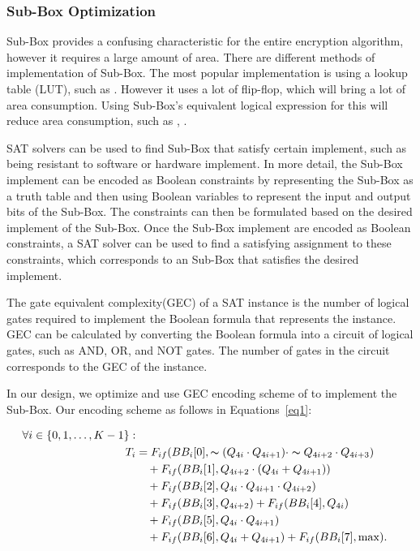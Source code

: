 \documentclass[sn-basic]{sn-jnl}%
\begin{document}
\subsubsection{Sub-Box Optimization }\label{subsubsec1}
Sub-Box provides a confusing characteristic for the entire encryption algorithm, however it requires a large amount of area.
There are different methods of implementation of Sub-Box.
The most popular implementation is using a lookup table (LUT), such as \cite{lara2017lightweight}.
However it uses a lot of flip-flop, which will bring a lot of area consumption.
Using Sub-Box's equivalent logical expression for this will reduce area consumption, such as \cite{bao2019peigen}, \cite{bib16}.

SAT solvers can be used to find Sub-Box that satisfy certain implement, such as being resistant to software or hardware implement.
In more detail, the Sub-Box implement can be encoded as Boolean constraints by representing the Sub-Box as a truth table and then using Boolean variables to represent the input and output bits of the Sub-Box.
The constraints can then be formulated based on the desired implement of the Sub-Box.
Once the Sub-Box implement are encoded as Boolean constraints, a SAT solver can be used to find a satisfying assignment to these constraints, which corresponds to an Sub-Box that satisfies the desired implement.

The gate equivalent complexity(GEC) of a SAT instance is the number of logical gates required to implement the Boolean formula that represents the instance.
GEC can be calculated by converting the Boolean formula into a circuit of logical gates, such as AND, OR, and NOT gates.
The number of gates in the circuit corresponds to the GEC of the instance.

In our design, we optimize and use GEC encoding scheme of \cite{bib16} to implement the Sub-Box.
Our encoding scheme as follows in Equations~\ref{eq1}:

\begin{align}
    \forall i \in \{0,1,\ldots ,K-1\}: \nonumber                                                                  \\
    T_i & = F_{if} (BB_i[0], \thicksim (Q_{4i} \cdot Q_{4i+1}) \cdot \thicksim Q_{4i+2} \cdot Q_{4i+3}) \nonumber \\
        & \quad + F_{if} (BB_i[1], Q_{4i+2} \cdot (Q_{4i} + Q_{4i+1})) \nonumber                                  \\
        & \quad + F_{if} (BB_i[2], Q_{4i} \cdot Q_{4i+1} \cdot Q_{4i+2}) \nonumber                                \\
        & \quad + F_{if} (BB_i[3], Q_{4i+2}) + F_{if} (BB_i[4], Q_{4i}) \nonumber                                 \\
        & \quad + F_{if} (BB_i[5], Q_{4i} \cdot Q_{4i+1}) \nonumber                                               \\
        & \quad + F_{if} (BB_i[6], Q_{4i} + Q_{4i+1}) + F_{if} (BB_i[7], \max). \label{eq1}
\end{align}
\end{document}
